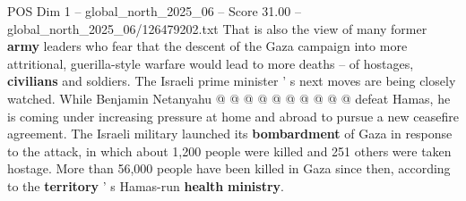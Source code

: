 \begin{textsample}{POS Dim 1 – global\_north\_2025\_06 – Score 31.00 – global\_north\_2025\_06/126479202.txt}
That is also the view of many former \textbf{army} leaders who fear that the descent of the Gaza campaign into more attritional, guerilla-style warfare would lead to more deaths -- of hostages, \textbf{civilians} and soldiers.
The Israeli prime minister ' s next moves are being closely watched.
While Benjamin Netanyahu @ @ @ @ @ @ @ @ @ @ defeat Hamas, he is coming under increasing pressure at home and abroad to pursue a new ceasefire agreement.
The Israeli military launched its \textbf{bombardment} of Gaza in response to the attack, in which about 1,200 people were killed and 251 others were taken hostage.
More than 56,000 people have been killed in Gaza since then, according to the \textbf{territory} ' s Hamas-run \textbf{health} \textbf{ministry}.

\end{textsample}
